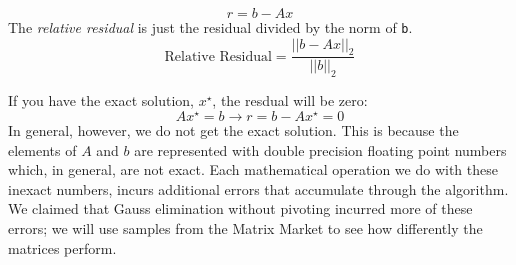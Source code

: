 \begin{equation}
r = b - Ax
\label{eq:lec8n-residual}
\end{equation}
The \emph{relative residual} is just the residual divided by the norm of \lstinline[style=myMatlab]{b}.
\begin{equation}
\text{Relative Residual} = \frac{||b - Ax||_{2}}{||b||_2}
\end{equation}

If you have the exact solution, $x^{\star}$, the resdual will be zero:
\begin{equation*}
Ax^{\star} = b \rightarrow r = b - Ax^{\star} = 0
\end{equation*}
In general, however, we do not get the exact solution.  This is because the elements of $A$ and $b$ are represented with double precision floating point numbers which, in general, are not exact.  Each mathematical operation we do with these inexact numbers, incurs additional errors that accumulate through the algorithm.  We claimed that Gauss elimination without pivoting incurred more of these errors; we will use samples from the Matrix Market to see how differently the matrices perform.

